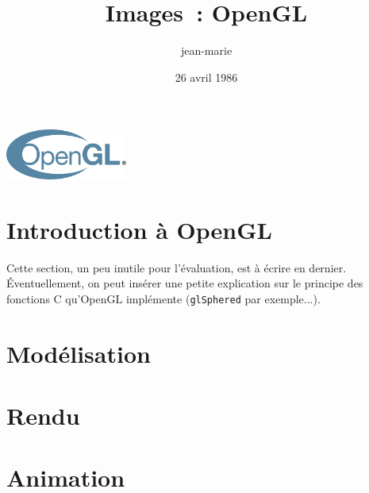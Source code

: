 \documentclass[a4paper, 10pt]{article}
\title{Images~: OpenGL}
\date{26 avril 1986}
\author{jean-marie}
\newcommand{\code}[1]{\texttt{#1}}
\begin{document}
\maketitle

\begin{center}
\includegraphics[width=4cm]{images/OpenGL_logo}
\end{center}

\tableofcontents

\section{Introduction à OpenGL}

Cette section, un peu inutile pour l'évaluation, est à écrire en dernier. 
Éventuellement, on peut insérer une petite explication sur le principe des
fonctions C qu'OpenGL implémente (\code{glSphered} par exemple...).

\section{Modélisation}

\section{Rendu}

\section{Animation}
\end{document}
